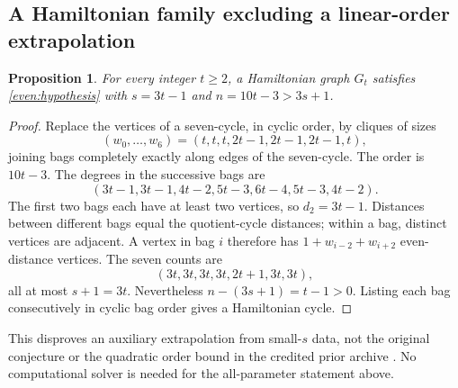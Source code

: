 \documentclass[11pt,a4paper]{article}
\newtheorem{proposition}[theorem]{Proposition}
\theoremstyle{definition}\newtheorem{definition}[theorem]{Definition}
\theoremstyle{remark}\newtheorem{remark}[theorem]{Remark}
\begin{document}
\subsection{A Hamiltonian family excluding a linear-order extrapolation}
\begin{proposition}\label{even:gt}
For every integer $t\ge2$, a Hamiltonian graph $G_t$ satisfies
\eqref{even:hypothesis} with $s=3t-1$ and $n=10t-3>3s+1$.
\end{proposition}
\begin{proof}
Replace the vertices of a seven-cycle, in cyclic order, by cliques
of sizes
\[
 (w_0,\ldots,w_6)=(t,t,t,2t-1,2t-1,2t-1,t),
\]
joining bags completely exactly along edges of the seven-cycle.
The order is $10t-3$. The degrees in the successive bags are
\[
 (3t-1,3t-1,4t-2,5t-3,6t-4,5t-3,4t-2).
\]
The first two bags each have at least two vertices, so $d_2=3t-1$.
Distances between different bags equal the quotient-cycle distances;
within a bag, distinct vertices are adjacent. A vertex in bag $i$
therefore has $1+w_{i-2}+w_{i+2}$ even-distance vertices. The seven
counts are
\[
 (3t,3t,3t,3t,2t+1,3t,3t),
\]
all at most $s+1=3t$. Nevertheless
$n-(3s+1)=t-1>0$. Listing each bag consecutively in cyclic bag order
gives a Hamiltonian cycle.
\end{proof}
This disproves an auxiliary extrapolation from small-$s$ data, not
the original conjecture or the quadratic order bound in the credited
prior archive \cite{even:pr70}. No computational solver is needed for
the all-parameter statement above.
\end{document}
